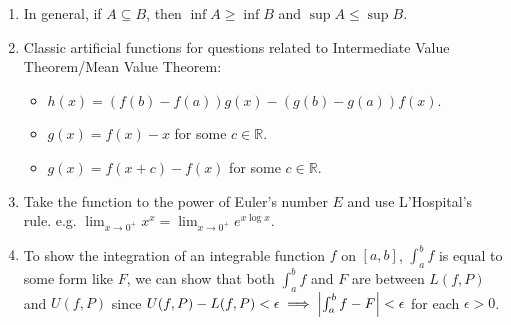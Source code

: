 \documentclass[12pt, lettersize]{book}
\theoremstyle{plain}
\theoremstyle{definition}
\theoremstyle{remark}
\newcommand{\R}{\mathbb{R}}
\begin{document}
\begin{enumerate}
		\item In general, if $A\subseteq B$, then $\inf A\geq \inf B$ and $\sup A\leq \sup B$.
		\item Classic artificial functions for questions related to Intermediate Value Theorem/Mean Value Theorem:
		\begin{itemize}
			\item $h(x)=(f(b)-f(a))g(x)-(g(b)-g(a))f(x)$.
			\item $g(x)=f(x)-x$ for some $c\in\R$.
			\item $g(x)=f(x+c)-f(x)$ for some $c\in\R$.
		\end{itemize}
		\item Take the function to the power of Euler's number $E$ and use L'Hospital's rule. e.g. $\lim_{x\rightarrow0^+}x^x=\lim_{x\rightarrow0^+}e^{x\log x}$.
		\item To show the integration of an integrable function $f$ on $[a,b]$, $\int_{a}^{b}f$ is equal to some form like $F$, we can show that both $\int_{a}^{b}f$ and $F$ are between $L(f,P)$ and $U(f,P)$ since $U(f,P)-L(f,P)<\epsilon\implies \abs{\int_{a}^{b}f-F}<\epsilon$ for each $\epsilon>0$.
	\end{enumerate}
	
\end{document}
